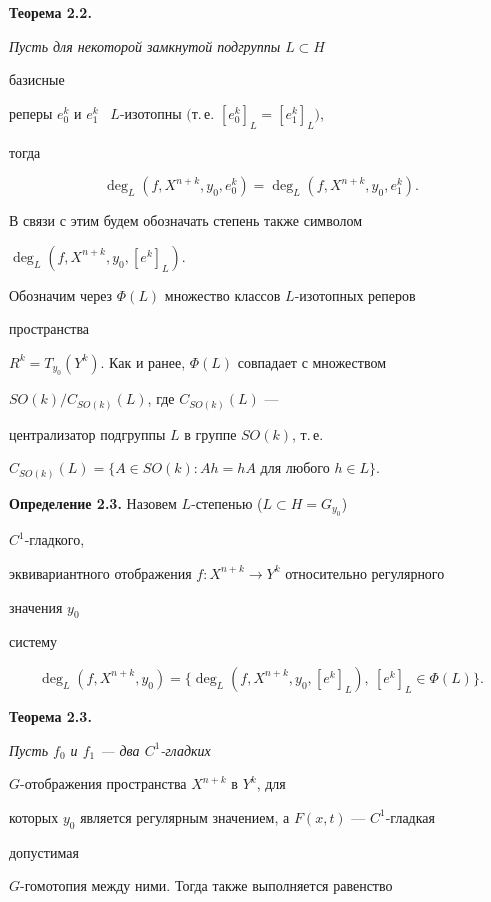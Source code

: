 \medskip 


 


{\bf Теорема 2.2.} {\it Пусть для некоторой замкнутой подгруппы $L\subset H$ 


базисные 


реперы $e^k_0$ и $e^k_1$ \ $L$-изотопны $($т.\,е. $[e^k_0]_L=[e^k_1]_L)$, 


тогда} 


$$ 


\deg_L(f,X^{n+k},y_0,e^k_0)=\deg_L(f,X^{n+k},y_0,e^k_1). 


$$ 


\medskip 


 


 


В связи с этим будем обозначать степень также символом 


$\deg_L(f,X^{n+k},y_0,[e^k]_L)$. 


Обозначим через $\Phi(L)$ множество классов $L$-изотопных реперов 


пространства 


$R^k=T_{y_0}(Y^k)$. Как и ранее, $\Phi(L)$ совпадает с множеством 


$SO(k)/C_{SO(k)}(L)$, где $C_{SO(k)}(L)$ --- 


централизатор подгруппы $L$ в группе $SO(k)$, т.\,е. 


$C_{SO(k)}(L)=\{A\in SO(k):Ah=hA$ для любого $h\in L\}$. 


\medskip 


 


{\bf Определение 2.3.} Назовем $L$-степенью ($L\subset H=G_{y_0}$) 


$C^{1}$-гладкого, 


эквивариантного отображения $f:X^{n+k}\to Y^k$ относительно регулярного 


значения $y_0$ 


систему 


$$ 


\deg_L(f,X^{n+k},y_0)=\{\deg_L(f,X^{n+k},y_0,[e^k]_L), 


\ [e^k]_L\in\Phi(L)\}. 


$$ 


\medskip 


 


{\bf Теорема 2.3.} {\it Пусть $f_0$ и $f_1$ --- два $C^1$-гладких 


$G$-отображения пространства $X^{n+k}$ в $Y^k$, для 


которых $y_0$ является регулярным значением, а $F(x,t)$ --- $C^1$-гладкая 


допустимая 


$G$-го\-мо\-то\-пия между ними. Тогда также выполняется равенство} 


